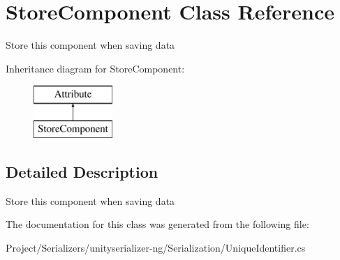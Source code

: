 \hypertarget{class_store_component}{}\section{Store\+Component Class Reference}
\label{class_store_component}


Store this component when saving data  


Inheritance diagram for Store\+Component\+:\begin{figure}[H]
\begin{center}
\leavevmode
\includegraphics[height=2.000000cm]{class_store_component}
\end{center}
\end{figure}


\subsection{Detailed Description}
Store this component when saving data 



The documentation for this class was generated from the following file\+:\begin{DoxyCompactItemize}
\item 
Project/\+Serializers/unityserializer-\/ng/\+Serialization/Unique\+Identifier.\+cs\end{DoxyCompactItemize}
